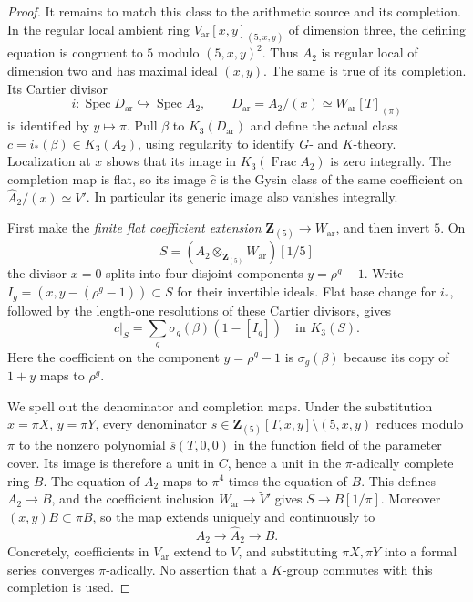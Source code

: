 \documentclass[11pt,a4paper]{article}
\theoremstyle{remark}
\begin{document}
\begin{proof}
It remains to match this class to the arithmetic source and its
completion. In the regular local ambient ring
$V_{\mathrm{ar}}[x,y]_{(5,x,y)}$ of dimension three, the defining
equation is congruent to $5$ modulo $(5,x,y)^2$. Thus $A_2$ is
regular local of dimension two and has maximal ideal $(x,y)$.
The same is true of its completion. Its Cartier divisor
\[
 i:\operatorname{Spec}D_{\mathrm{ar}}\hookrightarrow
       \operatorname{Spec}A_2,
 \qquad
 D_{\mathrm{ar}}=A_2/(x)
       \simeq W_{\mathrm{ar}}[T]_{(\pi)}
\]
is identified by $y\mapsto\pi$. Pull $\beta$ to
$K_3(D_{\mathrm{ar}})$ and define the actual class
$c=i_*(\beta)\in K_3(A_2)$, using regularity to identify
$G$- and $K$-theory. Localization at $x$ shows that its image
in $K_3(\operatorname{Frac}A_2)$ is zero integrally.
The completion map is flat, so its image $\widehat c$ is the
Gysin class of the same coefficient on
$\widehat A_2/(x)\simeq V'$. In particular its generic image
also vanishes integrally.

First make the \emph{finite flat coefficient extension}
$\mathbf Z_{(5)}\to W_{\mathrm{ar}}$,
and then invert $5$. On
\[
 S=(A_2\otimes_{\mathbf Z_{(5)}}W_{\mathrm{ar}})[1/5]
\]
the divisor $x=0$ splits into four disjoint components
$y=\rho^g-1$. Write $I_g=(x,y-(\rho^g-1))\subset S$ for
their invertible ideals. Flat base change for $i_*$, followed
by the length-one resolutions of these Cartier divisors, gives
\[
 c|_S=\sum_g\sigma_g(\beta)(1-[I_g])\quad\text{in }K_3(S).
\]
Here the coefficient on the component $y=\rho^g-1$ is
$\sigma_g(\beta)$ because its copy of $1+y$ maps to $\rho^g$.

We spell out the denominator and completion maps. Under the
substitution $x=\pi X$, $y=\pi Y$, every denominator
$s\in\mathbf Z_{(5)}[T,x,y]\setminus(5,x,y)$ reduces modulo
$\pi$ to the nonzero polynomial $\overline s(T,0,0)$ in the
function field of the parameter cover. Its image is therefore
a unit in $C$, hence a unit in the $\pi$-adically complete ring
$B$. The equation of $A_2$ maps to $\pi^4$ times the equation
of $B$. This defines $A_2\to B$, and the coefficient inclusion
$W_{\mathrm{ar}}\to\widetilde V'$ gives
$S\to B[1/\pi]$. Moreover $(x,y)B\subset\pi B$, so the map
extends uniquely and continuously to
\[
 A_2\longrightarrow\widehat A_2\longrightarrow B.
\]
Concretely, coefficients in $V_{\mathrm{ar}}$ extend to $V$,
and substituting $\pi X,\pi Y$ into a formal series converges
$\pi$-adically. No assertion that a $K$-group commutes with this
completion is used.


\end{proof}
\end{document}
